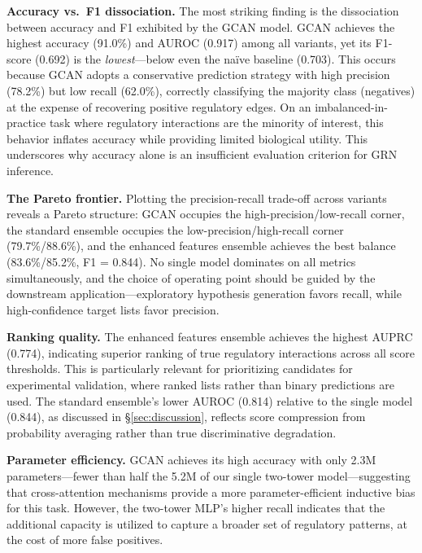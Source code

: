 \documentclass[10pt,twocolumn]{article}
\begin{document}
\textbf{Accuracy vs.\ F1 dissociation.}
The most striking finding is the dissociation between accuracy and F1 exhibited by the GCAN model.
GCAN achieves the highest accuracy (91.0\%) and AUROC (0.917) among all variants, yet its F1-score (0.692) is the \textit{lowest}---below even the na\"{i}ve baseline (0.703).
This occurs because GCAN adopts a conservative prediction strategy with high precision (78.2\%) but low recall (62.0\%), correctly classifying the majority class (negatives) at the expense of recovering positive regulatory edges.
On an imbalanced-in-practice task where regulatory interactions are the minority of interest, this behavior inflates accuracy while providing limited biological utility.
This underscores why accuracy alone is an insufficient evaluation criterion for GRN inference.

\textbf{The Pareto frontier.}
Plotting the precision-recall trade-off across variants reveals a Pareto structure: GCAN occupies the high-precision/low-recall corner, the standard ensemble occupies the low-precision/high-recall corner (79.7\%/88.6\%), and the enhanced features ensemble achieves the best balance (83.6\%/85.2\%, F1 = 0.844).
No single model dominates on all metrics simultaneously, and the choice of operating point should be guided by the downstream application---exploratory hypothesis generation favors recall, while high-confidence target lists favor precision.

\textbf{Ranking quality.}
The enhanced features ensemble achieves the highest AUPRC (0.774), indicating superior ranking of true regulatory interactions across all score thresholds.
This is particularly relevant for prioritizing candidates for experimental validation, where ranked lists rather than binary predictions are used.
The standard ensemble's lower AUROC (0.814) relative to the single model (0.844), as discussed in \S\ref{sec:discussion}, reflects score compression from probability averaging rather than true discriminative degradation.

\textbf{Parameter efficiency.}
GCAN achieves its high accuracy with only 2.3M parameters---fewer than half the 5.2M of our single two-tower model---suggesting that cross-attention mechanisms provide a more parameter-efficient inductive bias for this task.
However, the two-tower MLP's higher recall indicates that the additional capacity is utilized to capture a broader set of regulatory patterns, at the cost of more false positives.
\end{document}
